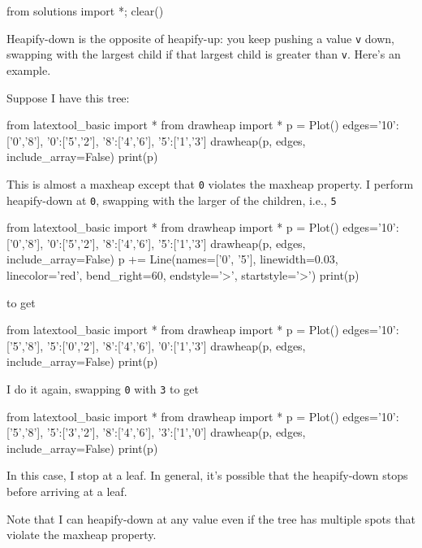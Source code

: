 \begin{python0}
from solutions import *; clear()
\end{python0}

Heapify-down is the opposite of heapify-up:
you keep pushing a value \verb!v! down, swapping with the largest child
if that largest child is greater than \verb!v!. 
Here's an example.

Suppose I have this tree:

\begin{python}
from latextool_basic import *
from drawheap import *
p = Plot()
edges={'10':['0','8'],
       '0':['5','2'],
       '8':['4','6'],
       '5':['1','3']
       }
drawheap(p, edges, include_array=False)
print(p)
\end{python}

This is almost a maxheap except that \verb!0!
violates the maxheap property.
I perform heapify-down at \verb!0!, swapping with
the larger of the children, i.e., \verb!5!


\begin{python}
from latextool_basic import *
from drawheap import *
p = Plot()
edges={'10':['0','8'],
       '0':['5','2'],
       '8':['4','6'],
       '5':['1','3']
       }
drawheap(p, edges, include_array=False)
p += Line(names=['0', '5'], linewidth=0.03, linecolor='red',
          bend_right=60, endstyle='>', startstyle='>')       
print(p)
\end{python}

to get


\begin{python}
from latextool_basic import *
from drawheap import *
p = Plot()
edges={'10':['5','8'],
       '5':['0','2'],
       '8':['4','6'],
       '0':['1','3']
       }
drawheap(p, edges, include_array=False)
print(p)
\end{python}

I do it again, swapping \verb!0! with \verb!3! to get

\begin{python}
from latextool_basic import *
from drawheap import *
p = Plot()
edges={'10':['5','8'],
       '5':['3','2'],
       '8':['4','6'],
       '3':['1','0']
       }
drawheap(p, edges, include_array=False)
print(p)
\end{python}

In this case, I stop at a leaf.
In general, it's possible that the heapify-down stops before
arriving at a leaf.

Note that I can heapify-down at any value even if
the tree has multiple spots that violate the
maxheap property.

